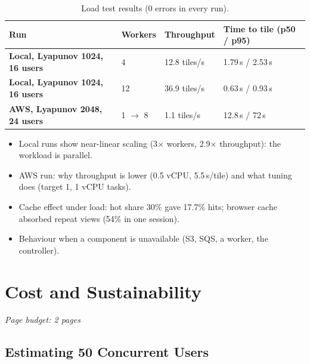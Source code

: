 \documentclass[a4paper,12pt]{article}
\newcommand{\budget}[1]{\hfill{\small\textcolor{mutedText}{\emph{Page budget: #1}}}\par}
\begin{document}
\begin{table}[H]
\centering
\small
\begin{tabularx}{\linewidth}{>{\bfseries}p{3.6cm} X X X}
\toprule
Run & Workers & Throughput & Time to tile (p50 / p95) \\
\midrule
Local, Lyapunov 1024, 16 users & 4 & 12.8 tiles/s & 1.79\,s / 2.53\,s \\
Local, Lyapunov 1024, 16 users & 12 & 36.9 tiles/s & 0.63\,s / 0.93\,s \\
AWS, Lyapunov 2048, 24 users & 1 $\rightarrow$ 8 & 1.1 tiles/s & 12.8\,s / 72\,s \\
\bottomrule
\end{tabularx}
\caption{Load test results (0 errors in every run).}
\label{tab:load}
\end{table}

\begin{yourwriting}
\begin{itemize}
    \item Local runs show near-linear scaling (3$\times$ workers, 2.9$\times$ throughput): the workload is parallel.
    \item AWS run: why throughput is lower (0.5 vCPU, 5.5\,s/tile) and what tuning does (target 1, 1 vCPU tasks).
    \item Cache effect under load: hot share 30\% gave 17.7\% hits; browser cache absorbed repeat views (54\% in one session).
    \item Behaviour when a component is unavailable (S3, SQS, a worker, the controller).
\end{itemize}
\end{yourwriting}

\newpage
\section{Cost and Sustainability}
\budget{2 pages}

\subsection{Estimating 50 Concurrent Users}
\end{document}
